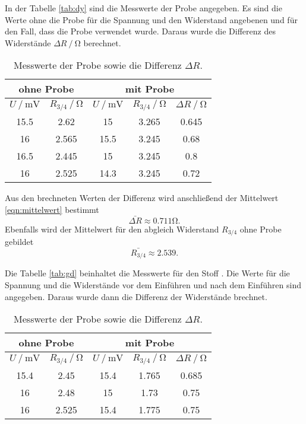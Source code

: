 In der Tabelle \eqref{tab:dy} sind die Messwerte der Probe  angegeben. Es sind die 
Werte ohne die Probe für die Spannung und den Widerstand angebenen und für den Fall, dass die Probe
verwendet wurde. Daraus wurde die Differenz des Widerstände $\Delta R\mathbin{/}\si{\ohm}$ berechnet.

\begin{table}
  \centering
  \caption{Messwerte der Probe  sowie die Differenz $\Delta R$.}
  \label{tab:dy}
\begin{tabular}{c c | c c | c}
  \hline
  \multicolumn{2}{c}{ohne Probe} & \multicolumn{3}{c}{mit Probe} \\
  \hline
  $U\mathbin{/} \si{\mV}$ & $R_{3/4}\mathbin{/} \si{\ohm}$ & $U\mathbin{/} \si{\mV}$ & $R_{3/4}\mathbin{/} \si{\ohm}$ & $\Delta R\mathbin{/}\si{\ohm}$ \\
  \hline
  15.5  & 2.62 & 15    & 3.265 & 0.645\\
  16  & 2.565 & 15.5   & 3.245 & 0.68\\
  16.5 & 2.445 & 15   & 3.245 & 0.8\\
  16  & 2.525 & 14.3   & 3.245 & 0.72\\
  \bottomrule
  \end{tabular}
\end{table}

Aus den brechneten Werten der Differenz wird anschließend der Mittelwert \eqref{eqn:mittelwert} bestimmt
\begin{equation*}
  \bar{\Delta R} \approx 0.711 \si{\ohm}.
\end{equation*}
Ebenfalls wird der Mittelwert für den abgleich Widerstand $R_{3/4}$ ohne Probe gebildet
\begin{equation*}
  \bar{R_{3/4}} \approx 2.539.
\end{equation*}

Die Tabelle \eqref{tab:gd} beinhaltet die Messwerte für den Stoff . Die Werte für die Spannung und die Widerstände
vor dem Einführen und nach dem Einführen sind angegeben. Daraus wurde dann die Differenz der Widerstände brechnet. 
\begin{table}
  \centering
  \caption{Messwerte der Probe  sowie die Differenz $\Delta R$.}
  \label{tab:gd}
\begin{tabular}{c c | c c | c}
  \hline
  \multicolumn{2}{c}{ohne Probe} & \multicolumn{3}{c}{mit Probe} \\
  \hline
  $U\mathbin{/} \si{\mV}$ & $R_{3/4}\mathbin{/} \si{\ohm}$ & $U\mathbin{/} \si{\mV}$ & $R_{3/4}\mathbin{/} \si{\ohm}$ & $\Delta R\mathbin{/}\si{\ohm}$ \\
  \hline
  15.4 & 2.45 & 15.4  & 1.765 & 0.685\\
  16  & 2.48 & 15  & 1.73 & 0.75\\
  16 & 2.525& 15.4  & 1.775 & 0.75\\
  \bottomrule
  \end{tabular}
\end{table}

